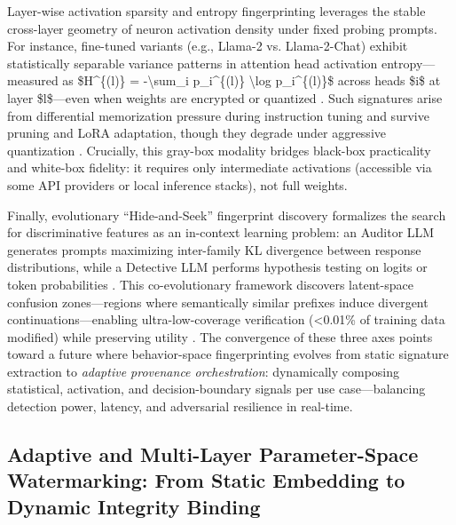 \documentclass[11pt,a4paper]{article}
\begin{document}
Layer-wise activation sparsity and entropy fingerprinting leverages the stable cross-layer geometry of neuron activation density under fixed probing prompts. For instance, fine-tuned variants (e.g., Llama-2 vs. Llama-2-Chat) exhibit statistically separable variance patterns in attention head activation entropy---measured as \$H\textasciicircum{}\{(l)\} = -\textbackslash{}sum\_i p\_i\textasciicircum{}\{(l)\} \textbackslash{}log p\_i\textasciicircum{}\{(l)\}\$ across heads \$i\$ at layer \$l\$---even when weights are encrypted or quantized \cite{arxiv:2601.14311}. Such signatures arise from differential memorization pressure during instruction tuning and survive pruning and LoRA adaptation, though they degrade under aggressive quantization \cite{doi:10.1109/icassp48485.2024.10447264}. Crucially, this gray-box modality bridges black-box practicality and white-box fidelity: it requires only intermediate activations (accessible via some API providers or local inference stacks), not full weights.

Finally, evolutionary ``Hide-and-Seek'' fingerprint discovery formalizes the search for discriminative features as an in-context learning problem: an Auditor LLM generates prompts maximizing inter-family KL divergence between response distributions, while a Detective LLM performs hypothesis testing on logits or token probabilities \cite{arxiv:2601.01296,arxiv:2407.10887}. This co-evolutionary framework discovers latent-space confusion zones---regions where semantically similar prefixes induce divergent continuations---enabling ultra-low-coverage verification (<0.01\% of training data modified) while preserving utility \cite{arxiv:2601.01296}. The convergence of these three axes points toward a future where behavior-space fingerprinting evolves from static signature extraction to \emph{adaptive provenance orchestration}: dynamically composing statistical, activation, and decision-boundary signals per use case---balancing detection power, latency, and adversarial resilience in real-time.


\subsection{Adaptive and Multi-Layer Parameter-Space Watermarking: From Static Embedding to Dynamic Integrity Binding}
\end{document}
